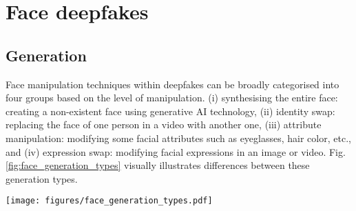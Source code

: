 \section{Face deepfakes}\label{sec:face_deepfakes} %
\subsection{Generation}

Face manipulation techniques within deepfakes can be broadly categorised into four groups based on the level of manipulation. (i) synthesising the entire face: creating a non-existent face using generative AI technology, (ii) identity swap: replacing the face of one person in a video with another one, (iii) attribute manipulation: modifying some facial attributes such as eyeglasses, hair color, etc., and (iv) expression swap: modifying facial expressions in an image or video. Fig. \ref{fig:face_generation_types} visually illustrates differences between these generation types. 



\begin{figure*}[htbp]
    \centering
    \texttt{[image: figures/face\_generation\_types.pdf]}
    \caption{Illustration of different face generation techniques within deepfakes. Sub-figures (i)-(iv) have been sourced from {\tiny\protect\footnotemark[2]}, {\tiny\protect\footnotemark[3]}, {\tiny\protect\footnotemark[4]}, and {\tiny\protect\footnotemark[5]}, respectively.}
    \label{fig:face_generation_types}
\end{figure*}


